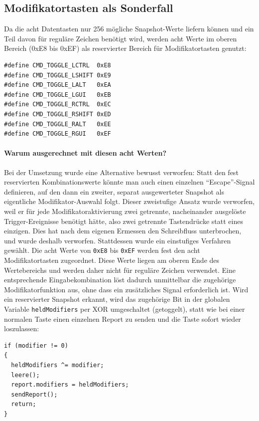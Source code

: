 \documentclass{article}
\begin{document}
\subsection{Modifikatortasten als Sonderfall}
\label{sec:modifier}
Da die acht Datentasten nur 256 mögliche Snapshot-Werte liefern können und ein Teil davon für reguläre Zeichen benötigt wird, werden acht Werte im oberen Bereich (0xE8 bis 0xEF) als reservierter Bereich für Modifikatortasten genutzt:

\begin{lstlisting}[style=arduino]
#define CMD_TOGGLE_LCTRL  0xE8
#define CMD_TOGGLE_LSHIFT 0xE9
#define CMD_TOGGLE_LALT   0xEA
#define CMD_TOGGLE_LGUI   0xEB
#define CMD_TOGGLE_RCTRL  0xEC
#define CMD_TOGGLE_RSHIFT 0xED
#define CMD_TOGGLE_RALT   0xEE
#define CMD_TOGGLE_RGUI   0xEF
\end{lstlisting}
\paragraph{Warum ausgerechnet mit diesen acht Werten?}
Bei der Umsetzung wurde eine Alternative bewusst verworfen: Statt den fest reservierten Kombinationswerte könnte man auch einen einzelnen \enquote{Escape}-Signal definieren, auf den dann ein zweiter, separat ausgewerteter Snapshot als eigentliche Modifikator-Auswahl folgt. 
Dieser zweistufige Ansatz wurde verworfen, weil er für jede Modifikatoraktivierung zwei getrennte, nacheinander ausgelöste Trigger-Ereignisse benötigt hätte, also zwei getrennte Tastendrücke statt eines einzigen. Dies hat nach dem eigenen Ermessen den Schreibfluss unterbrochen, und wurde deshalb verworfen.
Stattdessen wurde ein einstufiges Verfahren gewählt. Die acht Werte von \texttt{0xE8} bis \texttt{0xEF} werden fest den acht Modifikatortasten zugeordnet. Diese Werte liegen am oberen Ende des Wertebereichs und werden daher nicht für reguläre Zeichen verwendet. Eine entsprechende Eingabekombination löst dadurch unmittelbar die zugehörige Modifikatorfunktion aus, ohne dass ein zusätzliches Signal erforderlich ist.
Wird ein reservierter Snapshot erkannt, wird das zugehörige Bit in der globalen Variable \texttt{heldModifiers} per XOR umgeschaltet (getoggelt), statt wie bei einer normalen Taste einen einzelnen Report zu senden und die Taste sofort wieder loszulassen:

\begin{lstlisting}[style=arduino]
if (modifier != 0)
{
  heldModifiers ^= modifier;
  leere();
  report.modifiers = heldModifiers;
  sendReport();
  return;
}
\end{lstlisting}
\end{document}
